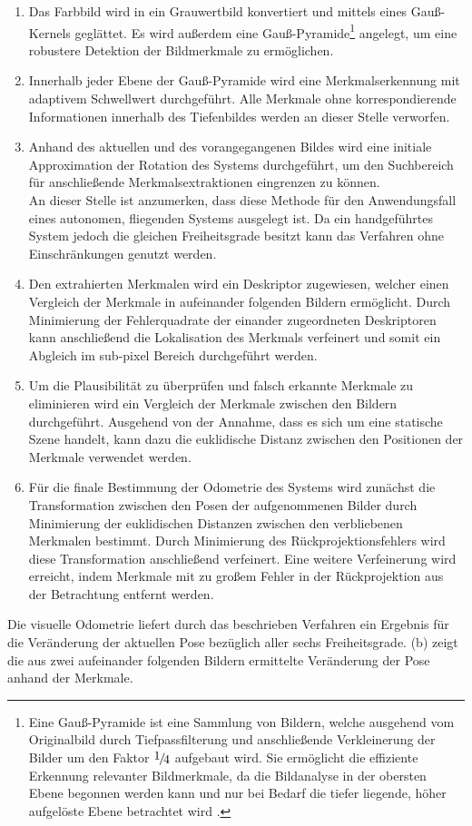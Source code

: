 \begin{enumerate}
\item Das Farbbild wird in ein Grauwertbild konvertiert und mittels eines Gauß-Kernels geglättet. Es wird außerdem eine Gauß-Pyramide\footnote{Eine Gauß-Pyramide ist eine Sammlung von Bildern, welche ausgehend vom Originalbild durch Tiefpassfilterung und anschließende Verkleinerung der Bilder um den Faktor $\nicefrac{1}{4}$ aufgebaut wird. Sie ermöglicht die effiziente Erkennung relevanter Bildmerkmale, da die Bildanalyse in der obersten Ebene begonnen werden kann und nur bei Bedarf die tiefer liegende, höher aufgelöste Ebene betrachtet wird \cite{Nischwitz20112}.} angelegt, um eine robustere Detektion der Bildmerkmale zu ermöglichen.
\item Innerhalb jeder Ebene der Gauß-Pyramide wird eine Merkmalserkennung mit adaptivem Schwellwert durchgeführt. Alle Merkmale ohne korrespondierende Informationen innerhalb des Tiefenbildes werden an dieser Stelle verworfen.
\item Anhand des aktuellen und des vorangegangenen Bildes wird eine initiale Approximation der Rotation des Systems durchgeführt, um den Suchbereich für anschließende Merkmalsextraktionen eingrenzen zu können.\\
An dieser Stelle ist anzumerken, dass diese Methode für den Anwendungsfall eines autonomen, fliegenden Systems ausgelegt ist. Da ein handgeführtes System jedoch die gleichen Freiheitsgrade besitzt kann das Verfahren ohne Einschränkungen genutzt werden.
\item Den extrahierten Merkmalen wird ein Deskriptor zugewiesen, welcher einen Vergleich der Merkmale in aufeinander folgenden Bildern ermöglicht. Durch Minimierung der Fehlerquadrate der einander zugeordneten Deskriptoren kann anschließend die Lokalisation des Merkmals verfeinert und somit ein Abgleich im sub-pixel Bereich durchgeführt werden.
\item Um die Plausibilität zu überprüfen und falsch erkannte Merkmale zu eliminieren wird ein Vergleich der Merkmale zwischen den Bildern durchgeführt. Ausgehend von der Annahme, dass es sich um eine statische Szene handelt, kann dazu die euklidische Distanz zwischen den Positionen der Merkmale verwendet werden.
\item Für die finale Bestimmung der Odometrie des Systems wird zunächst die Transformation zwischen den Posen der aufgenommenen Bilder durch Minimierung der euklidischen Distanzen zwischen den verbliebenen Merkmalen bestimmt. Durch Minimierung des Rückprojektionsfehlers wird diese Transformation anschließend verfeinert. Eine weitere Verfeinerung wird erreicht, indem Merkmale mit zu großem Fehler in der Rückprojektion aus der Betrachtung entfernt werden.
\end{enumerate}
Die visuelle Odometrie liefert durch das beschrieben Verfahren ein Ergebnis für die Veränderung der aktuellen Pose bezüglich aller sechs Freiheitsgrade.  (b) zeigt die aus zwei aufeinander folgenden Bildern ermittelte Veränderung der Pose anhand der Merkmale.\\

